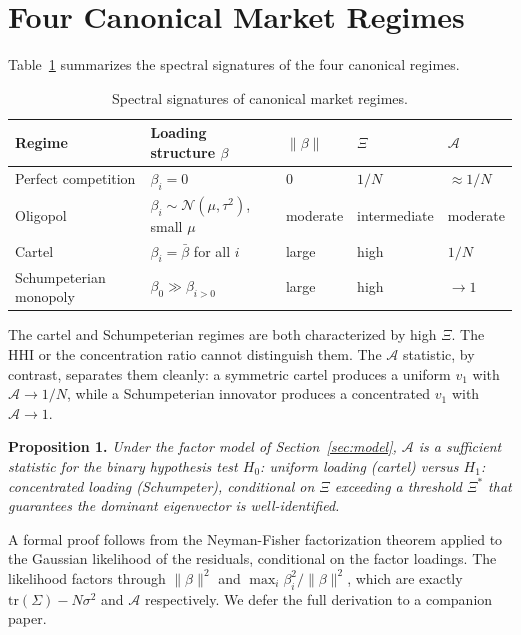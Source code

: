 \documentclass[12pt,a4paper]{article}
\newcommand{\SEA}{\mathcal{A}}
\begin{document}
\section{Four Canonical Market Regimes}
\label{sec:regimes}

Table~\ref{tab:regimes} summarizes the spectral signatures of the four canonical regimes.

\begin{table}[H]
\centering
\caption{Spectral signatures of canonical market regimes.}
\label{tab:regimes}
\begin{tabular}{@{}lllll@{}}
\toprule
Regime & Loading structure $\beta$ & $\|\beta\|$ & $\Xi$ & $\SEA$ \\
\midrule
Perfect competition & $\beta_i = 0$ & 0 & $1/N$ & $\approx 1/N$ \\
Oligopol & $\beta_i \sim \mathcal{N}(\mu, \tau^2)$, small $\mu$ & moderate & intermediate & moderate \\
Cartel & $\beta_i = \bar\beta$ for all $i$ & large & high & $1/N$ \\
Schumpeterian monopoly & $\beta_0 \gg \beta_{i > 0}$ & large & high & $\to 1$ \\
\bottomrule
\end{tabular}
\end{table}

The cartel and Schumpeterian regimes are both characterized by high $\Xi$. The HHI or the concentration ratio cannot distinguish them. The $\SEA$ statistic, by contrast, separates them cleanly: a symmetric cartel produces a uniform $v_1$ with $\SEA \to 1/N$, while a Schumpeterian innovator produces a concentrated $v_1$ with $\SEA \to 1$.

\textbf{Proposition 1.} \textit{Under the factor model of Section~\ref{sec:model}, $\SEA$ is a sufficient statistic for the binary hypothesis test $H_0$: uniform loading (cartel) versus $H_1$: concentrated loading (Schumpeter), conditional on $\Xi$ exceeding a threshold $\Xi^*$ that guarantees the dominant eigenvector is well-identified.}

A formal proof follows from the Neyman-Fisher factorization theorem applied to the Gaussian likelihood of the residuals, conditional on the factor loadings. The likelihood factors through $\|\beta\|^2$ and $\max_i \beta_i^2 / \|\beta\|^2$, which are exactly $\mathrm{tr}(\Sigma) - N\sigma^2$ and $\SEA$ respectively. We defer the full derivation to a companion paper.
\end{document}
